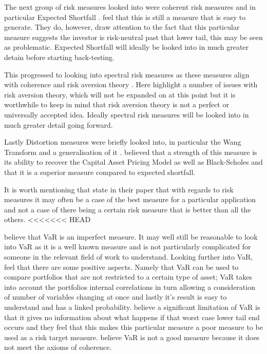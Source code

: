 \documentclass[12pt,a4paper]{article}
\begin{document}
The next group of risk measures looked into were coherent risk measures and in particular Expected Shortfall \citep{ACERBI20021505}. \cite{dowd2006after} feel that this is still a measure that is easy to generate. They do, however, draw attention to the fact that this particular measure suggests the investor is risk-neutral past that lower tail, this may be seen as problematic. Expected Shortfall will ideally be looked into in much greater detain before starting back-testing.

This progressed to looking into spectral risk measures as these measures align with coherence and risk aversion theory \citep{dowd2006after}. Here \cite{dowd2006after} highlight a number of issues with risk aversion theory, which will not be expanded on at this point but it is worthwhile to keep in mind that risk aversion theory is not a perfect or universally accepted idea. Ideally spectral risk measures will be looked into in much greater detail going forward.

Lastly Distortion measures were briefly looked into, in particular the Wang Transform and a generalisation of it  \citep{dowd2006after}. \cite{dowd2006after} believed that a strength of this measure is its ability to recover the Capital Asset Pricing Model as well as Black-Scholes and that it is a superior measure compared to expected shortfall.
 
It is worth mentioning that \cite{dowd2006after} state in their paper that with regards to risk measures it may often be a case of the best measure for a particular application and not a case of there being a certain risk measure that is better than all the others. 
<<<<<<< HEAD

\cite{dowd2006after} believe that VaR is an imperfect measure. It may well still be reasonable to look into VaR as it is a well known measure and is not particularly complicated for someone in the relevant field of work to understand. Looking further into VaR, \cite{dowd2006after} feel that there are some positive aspects. Namely that VaR can be used to compare portfolios that are not restricted to a certain type of asset; VaR takes into account the portfolios internal correlations in turn allowing a consideration of number of variables changing at once and lastly it's result is easy to understand and has a linked probability.  \cite{dowd2006after} believe a significant limitation of VaR is that it gives no information about what happens if that worst case lower tail end occurs and they feel that this makes this particular measure a poor measure to be used as a risk target measure. \cite{ACERBI20021505} believe VaR is not a good measure because it does not meet the axioms of coherence.
\end{document}
